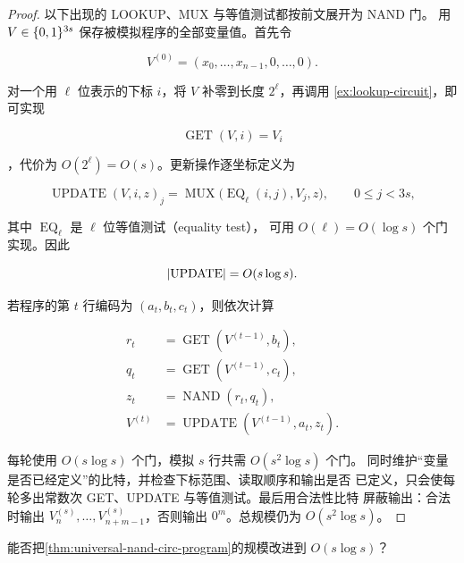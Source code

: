 \begin{proof}
  以下出现的 LOOKUP、MUX 与等值测试都按前文展开为 NAND 门。
  用 $V\in\{0,1\}^{3s}$ 保存被模拟程序的全部变量值。首先令

  \[
    V^{(0)}=(x_0,\ldots,x_{n-1},0,\ldots,0).
  \]

  对一个用 $\ell$ 位表示的下标 $i$，将 $V$ 补零到长度 $2^\ell$，再调用
  \cref{ex:lookup-circuit}，即可实现

  \[
    \operatorname{GET}(V,i)=V_i
  \]

  ，代价为 $O(2^\ell)=O(s)$。更新操作逐坐标定义为

  \[
    \operatorname{UPDATE}(V,i,z)_j
    =\operatorname{MUX}\bigl(
      \operatorname{EQ}_{\ell}(i,j),V_j,z
    \bigr),
    \qquad 0\leq j<3s,
  \]

  其中 $\operatorname{EQ}_{\ell}$ 是 $\ell$ 位等值测试（equality test），
  可用 $O(\ell)=O(\log s)$ 个门实现。因此

  \[
    \lvert \operatorname{UPDATE}\rvert=O(s\log s).
  \]

  若程序的第 $t$ 行编码为 $(a_t,b_t,c_t)$，则依次计算

  \begin{align*}
    r_t&=\operatorname{GET}(V^{(t-1)},b_t),\\
    q_t&=\operatorname{GET}(V^{(t-1)},c_t),\\
    z_t&=\operatorname{NAND}(r_t,q_t),\\
    V^{(t)}&=\operatorname{UPDATE}(V^{(t-1)},a_t,z_t).
  \end{align*}

  每轮使用 $O(s\log s)$ 个门，模拟 $s$ 行共需 $O(s^2\log s)$ 个门。
  同时维护“变量是否已经定义”的比特，并检查下标范围、读取顺序和输出是否
  已定义，只会使每轮多出常数次 GET、UPDATE 与等值测试。最后用合法性比特
  屏蔽输出：合法时输出 $V_n^{(s)},\ldots,V_{n+m-1}^{(s)}$，否则输出
  $0^m$。总规模仍为 $O(s^2\log s)$。
\end{proof}

\begin{question}
  能否把\cref{thm:universal-nand-circ-program}的规模改进到
  $O(s\log s)$？
\end{question}
